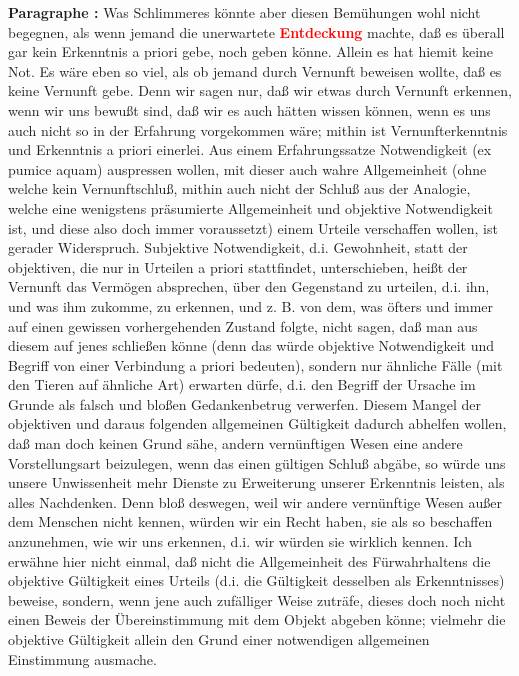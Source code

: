 \documentclass[a4paper,12pt,twoside]{book}
\newcommand{\match}[1]{\textcolor{red}{\textbf{#1}}}
\begin{document}
	\noindent\textbf{Paragraphe : }Was Schlimmeres könnte aber diesen Bemühungen wohl nicht begegnen, als wenn jemand die unerwartete \match{Entdeckung} machte, daß es überall gar kein Erkenntnis a priori gebe, noch geben könne. Allein es hat hiemit keine Not. Es wäre eben so viel, als ob jemand durch Vernunft beweisen wollte, daß es keine Vernunft gebe. Denn wir sagen nur, daß wir etwas durch Vernunft erkennen, wenn wir uns bewußt sind, daß wir es auch hätten wissen können, wenn es uns auch nicht so in der Erfahrung vorgekommen wäre; mithin ist Vernunfterkenntnis und Erkenntnis a priori einerlei. Aus einem Erfahrungssatze Notwendigkeit (ex pumice aquam) auspressen wollen, mit dieser auch wahre Allgemeinheit (ohne welche kein Vernunftschluß, mithin auch nicht der Schluß aus der Analogie, welche eine wenigstens präsumierte Allgemeinheit und objektive Notwendigkeit ist, und diese also doch immer voraussetzt) einem Urteile verschaffen wollen, ist gerader Widerspruch. Subjektive Notwendigkeit, d.i. Gewohnheit, statt der objektiven, die nur in Urteilen a priori stattfindet, unterschieben, heißt der Vernunft das Vermögen absprechen, über den Gegenstand zu urteilen, d.i. ihn, und was ihm zukomme, zu erkennen, und z. B. von dem, was öfters und immer auf einen gewissen vorhergehenden Zustand folgte, nicht sagen, daß man aus diesem auf jenes schließen könne (denn das würde objektive Notwendigkeit und Begriff von einer Verbindung a priori bedeuten), sondern nur ähnliche Fälle (mit den Tieren auf ähnliche Art) erwarten dürfe, d.i. den Begriff der Ursache im Grunde als  falsch und bloßen Gedankenbetrug verwerfen. Diesem Mangel der objektiven und daraus folgenden allgemeinen Gültigkeit dadurch abhelfen wollen, daß man doch keinen Grund sähe, andern vernünftigen Wesen eine andere Vorstellungsart beizulegen, wenn das einen gültigen Schluß abgäbe, so würde uns unsere Unwissenheit mehr Dienste zu Erweiterung unserer Erkenntnis leisten, als alles Nachdenken. Denn bloß deswegen, weil wir andere vernünftige Wesen außer dem Menschen nicht kennen, würden wir ein Recht haben, sie als so beschaffen anzunehmen, wie wir uns erkennen, d.i. wir würden sie wirklich kennen. Ich erwähne hier nicht einmal, daß nicht die Allgemeinheit des Fürwahrhaltens die objektive Gültigkeit eines Urteils (d.i. die Gültigkeit desselben als Erkenntnisses) beweise, sondern, wenn jene auch zufälliger Weise zuträfe, dieses doch noch nicht einen Beweis der Übereinstimmung mit dem Objekt abgeben könne; vielmehr die objektive Gültigkeit allein den Grund einer notwendigen allgemeinen Einstimmung ausmache. 
	
\end{document}
